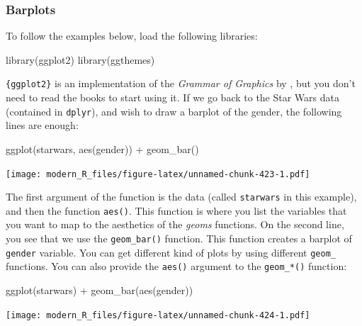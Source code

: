 \documentclass[
]{article}
\newenvironment{Shaded}{\begin{snugshade}}{\end{snugshade}}
\newcommand{\FunctionTok}[1]{\textcolor[rgb]{0.00,0.00,0.00}{#1}}
\newcommand{\NormalTok}[1]{#1}
\newcommand{\SpecialCharTok}[1]{\textcolor[rgb]{0.00,0.00,0.00}{#1}}
\begin{document}
\hypertarget{barplots}{%
\subsubsection{Barplots}\label{barplots}}

To follow the examples below, load the following libraries:

\begin{Shaded}
\begin{Highlighting}[]
\FunctionTok{library}\NormalTok{(ggplot2)}
\FunctionTok{library}\NormalTok{(ggthemes)}
\end{Highlighting}
\end{Shaded}

\texttt{\{ggplot2\}} is an implementation of the \emph{Grammar of Graphics} by \citet{wilkinson2006}, but you don't need
to read the books to start using it. If we go back to the Star Wars data (contained in \texttt{dplyr}),
and wish to draw a barplot of the gender, the following lines are enough:

\begin{Shaded}
\begin{Highlighting}[]
\FunctionTok{ggplot}\NormalTok{(starwars, }\FunctionTok{aes}\NormalTok{(gender)) }\SpecialCharTok{+}
  \FunctionTok{geom\_bar}\NormalTok{()}
\end{Highlighting}
\end{Shaded}

\texttt{[image: modern\_R\_files/figure-latex/unnamed-chunk-423-1.pdf]}

The first argument of the function is the data (called \texttt{starwars} in this example), and then the
function \texttt{aes()}. This function is where you list the variables that you want to map to the aesthetics
of the \emph{geoms} functions. On the second line, you see that we use the \texttt{geom\_bar()} function. This
function creates a barplot of \texttt{gender} variable.
You can get different kind of plots by using different \texttt{geom\_} functions. You can also provide the
\texttt{aes()} argument to the \texttt{geom\_*()} function:

\begin{Shaded}
\begin{Highlighting}[]
\FunctionTok{ggplot}\NormalTok{(starwars) }\SpecialCharTok{+}
  \FunctionTok{geom\_bar}\NormalTok{(}\FunctionTok{aes}\NormalTok{(gender))}
\end{Highlighting}
\end{Shaded}

\texttt{[image: modern\_R\_files/figure-latex/unnamed-chunk-424-1.pdf]}
\end{document}
